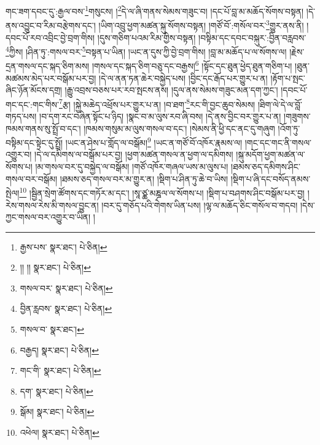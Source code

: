 གང་ཟག་དབང་དུ་:རྒྱལ་བས་\footnote{རྒྱས་པས་  སྣར་ཐང་།  པེ་ཅིན། }གསུངས། །\footnote{།། །།  སྣར་ཐང་།  པེ་ཅིན། }དེ་ལ་ཞི་གནས་སེམས་གཟུང་བ། །དང་པོ་བླ་མ་མཆོད་སོགས་བསྟན། །དེ་ནས་འབྱུང་བ་རིམ་བརྩེགས་དང་། །ཡིག་འབྲུ་ཕྱག་མཚན་སྐུ་སོགས་བསྟན། །གཙོ་བོ་:གསོལ་བར་\footnote{གསལ་བར་  སྣར་ཐང་།  པེ་ཅིན། }གྱུར་ནས་ནི། །དབང་པོ་རབ་འབྲིང་བྱེ་བྲག་གིས། །དུས་གཅིག་པའམ་རིམ་གྱིས་བསྟན། །བསྟིམ་དང་དབང་བསྐུར་:བྱིན་བརླབས་\footnote{བྱིན་རླབས་  སྣར་ཐང་།  པེ་ཅིན། }ཀྱིས། །ཤིན་ཏུ་:གསལ་བར་\footnote{གསལ་བ་  སྣར་ཐང་། }བསྟན་པ་ཡིན། །ཡང་ན་དུས་ཀྱི་བྱེ་བྲག་གིས། །བླ་མ་མཆོད་པ་ལ་སོགས་ལ། །རྗེས་དྲན་གསལ་དང་སྐད་ཅིག་མས། །གསལ་དང་སྐད་ཅིག་བཅུ་དང་བརྒྱས།\footnote{བརྒྱད།  སྣར་ཐང་།  པེ་ཅིན། } །སྟོང་དང་ཐུན་ཕྱེད་ཐུན་གཅིག་པ། །ཐུན་མཚམས་མེད་པར་བསྒོམ་པར་བྱ། །དེ་ལ་ནན་ཏན་ཆེར་བསྐྱེད་པས། །བྱིང་དང་རྒོད་པར་གྱུར་པ་ན། །རྟོག་པ་སྤང་ཞིང་ཉོན་མོངས་དགྲ། །རྒྱུ་འབྲས་བཅས་པར་རབ་སྤངས་ནས། །དུལ་ནས་སེམས་གཟུང་མན་དག་ཀྱང་། །དབང་པོ་གང་དང་:གང་གིས་\footnote{གང་གི་  སྣར་ཐང་།  པེ་ཅིན། }རྩ། །སྐྱེ་མཆེད་འཕྲོས་པར་གྱུར་པ་ན། །བ་ཐག་\footnote{དག་  སྣར་ཐང་།  པེ་ཅིན། }རང་གི་བྱང་ཆུབ་སེམས། །ཐིག་ལེ་དེ་ལ་བློ་གཏད་པས། །བ་དག་རང་བཞིན་སྟོང་པ་ཉིད། །སྣང་བ་མ་ལུས་རབ་ཞི་བས། །དེ་ནས་བྱིང་བར་གྱུར་པ་ན། །གཟུགས་ཁམས་གནས་སུ་སྤྲོ་བ་དང་། །ཁམས་གསུམ་མ་ལུས་གསལ་བ་དང་། །སེམས་ནི་ཕྱི་དང་ནང་དུ་གཞུག །འོག་ཏུ་བསྟིམ་དང་སྟེང་དུ་སྤྲོ། །ཡང་ན་ཤེས་པ་གློད་ལ་བསྒོམ།\footnote{སྒོམ།  སྣར་ཐང་།  པེ་ཅིན། } །ཡང་ན་གཙོ་བོ་འཁོར་རྣམས་ལ། །གང་དང་གང་ནི་གསལ་འགྱུར་བ། །དེ་ལ་དམིགས་ལ་བསྒོམ་པར་བྱ། །ཕྱག་མཚན་གསལ་ན་ཕྱག་ལ་དམིགས། །སྐུ་མདོག་ཕྱག་མཚན་ལ་སོགས་པ། །མ་གསལ་བར་དུ་བསྐྱེད་ལ་བསྒོམ། །གཙོ་འཁོར་གཞལ་ཡས་མ་ལུས་པ། །ཐམས་ཅད་དམིགས་ཤིང་གསལ་བར་བསྒོམ། །ཐམས་ཅད་གསལ་བར་མ་གྱུར་ན། །སྡིག་པ་ཤིན་ཏུ་ཆེ་བ་ཡིས། །སྡིག་པ་ཞི་དང་བསོད་ནམས་སྤེལ།\footnote{འཕེལ།  སྣར་ཐང་།  པེ་ཅིན། } །སྦྱིན་སྲེག་ཚོགས་དང་གཏོར་མ་དང་། །སཱ་ཙྪ་མཎྜལ་ལ་སོགས་པ། །སྡིག་པ་བཤགས་ཤིང་བསྒོམ་པར་བྱ། །རེས་གསལ་རེས་མི་གསལ་བྱུང་ན། །བར་དུ་གཅོད་པའི་གེགས་ཡིན་པས། །ལྷ་ལ་མཆོད་ཅིང་གསོལ་བ་གདབ། །དེས་ཀྱང་གསལ་བར་འགྱུར་བ་ཡིན། །
